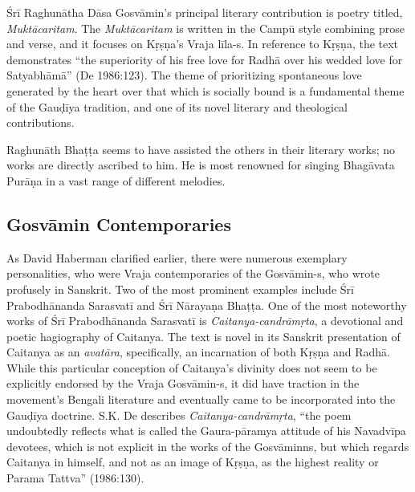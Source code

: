 Śrī Raghunātha Dāsa Gosvāmin’s principal literary contribution is poetry titled, {\sl Muktācaritam}. The {\sl Muktācaritam} is written in the Campū style combining prose and verse, and it focuses on Kṛṣṇa’s Vraja līla-s. In reference to Kṛṣṇa, the text demonstrates “the superiority of his free love for Radhā over his wedded love for Satyabhāmā” (De 1986:123). The theme of prioritizing spontaneous love generated by the heart over that which is socially bound is a fundamental theme of the Gauḍīya tradition, and one of its novel literary and theological contributions. 

Raghunāth Bhaṭṭa seems to have assisted the others in their literary works; no works are directly ascribed to him. He is most renowned for singing Bhagāvata Purāṇa in a vast range of different melodies. 

\subsection*{Gosvāmin Contemporaries}
\vskip -7pt

As David Haberman clarified earlier, there were numerous exemplary personalities, who were Vraja contemporaries of the Gosvāmin-s, who wrote profusely in Sanskrit. Two of the most prominent examples include Śrī Prabodhānanda Sarasvatī and Śrī Nārayaṇa Bhaṭṭa. One of the most noteworthy works of Śrī Prabodhānanda Sarasvatī is {\sl Caitanya-candrāmṛta}, a devotional and poetic hagiography of Caitanya. The text is novel in its Sanskrit presentation of Caitanya as an {\sl avatāra}, specifically, an incarnation of both Kṛṣṇa and Radhā. While this particular conception of Caitanya’s divinity does not seem to be explicitly endorsed by the Vraja Gosvāmin-s, it did have traction in the movement’s Bengali literature and eventually came to be incorporated into the Gauḍīya doctrine. S.K. De describes {\sl Caitanya-candrāmṛta}, “the poem undoubtedly reflects what is called the Gaura-pāramya attitude of his Navadvīpa devotees, which is not explicit in the works of the Gosvāminns, but which regards Caitanya in himself, and not as an image of Kṛṣṇa, as the highest reality or Parama Tattva” (1986:130). 

